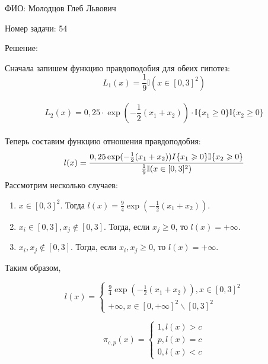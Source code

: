 \documentclass[14pt]{extarticle}
\begin{document}
ФИО: Молодцов Глеб Львович

\vspace{10pt}

Номер задачи: 54

\vspace{10pt}

Решение:

\vspace{10pt}

Сначала запишем функцию правдоподобия для обеих гипотез: \\

$$
L_1(x) = \frac{1}{9}\mathbb{I}(x\in[0,3]^2)$$
\\
$$L_2(x) = 0,25 \cdot \exp(-\frac{1}{2}(x_1 + x_2))\cdot \mathbb I\{x_1\geqslant 0\}\mathbb I\{x_2\geqslant 0\}
$$ \\

Теперь составим функцию отношения правдоподобия: \\
$$
l(x) = \frac{0,25\exp(-\frac{1}{2}(x_1 + x_2))\mathbb \mathbb I\{x_1\geqslant 0\}\mathbb I\{x_2\geqslant 0\}}{\frac{1}{9}\mathbb{I}(x\in[0,3]^2)}
$$
Рассмотрим несколько случаев:

\begin{enumerate}
\item $x\in [0,3]^2$. Тогда $l(x) = \frac{9}{4}\exp(-\frac{1}{2}(x_1 + x_2))$.
\item $x_i \in [0,3], x_j\notin[0,3]$. Тогда, если $x_j \geqslant 0$, то $l(x) = +\infty$.
\item $x_i, x_j \notin [0,3]$. Тогда, если $x_i, x_j \geqslant 0$, то $l(x) = +\infty$.
\end{enumerate}

Таким образом,

\begin{equation*}
l(x) = 
\begin{cases}
\frac{9}{4}\exp(-\frac{1}{2}(x_1 + x_2)), x\in[0,3]^2\\
+\infty, x\in [0, +\infty]^2\backslash[0,3]^2
\end{cases}
\end{equation*}

\begin{equation*}
\pi_{c, p}(x) = 
\begin{cases}
1, l(x) > c\\
p, l(x) = c\\
0, l(x) < c
\end{cases}
\end{equation*}
\end{document}
